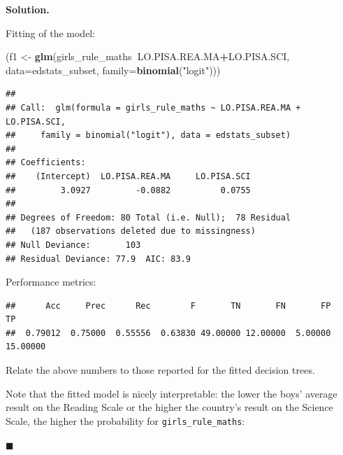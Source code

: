 \documentclass[10pt,b5paper,krantz1]{krantz}
\newenvironment{Shaded}{\begin{snugshade}}{\end{snugshade}}
\newcommand{\DataTypeTok}[1]{\textcolor[rgb]{0.27,0.27,0.27}{#1}}
\newcommand{\FloatTok}[1]{\textcolor[rgb]{0.06,0.06,0.06}{#1}}
\newcommand{\KeywordTok}[1]{\textcolor[rgb]{0.27,0.27,0.27}{\textbf{#1}}}
\newcommand{\NormalTok}[1]{#1}
\newcommand{\OperatorTok}[1]{\textcolor[rgb]{0.43,0.43,0.43}{\textbf{#1}}}
\newcommand{\StringTok}[1]{\textcolor[rgb]{0.5,0.5,0.5}{#1}}
\newenvironment{solution}{%
\bigskip\noindent\textbf{Solution. }%
\it\ignorespaces%
\ignorespaces%
}{\ignorespaces%
\hfill$\blacksquare$%
}
\begin{document}
\begin{solution}

Fitting of the model:

\begin{Shaded}
\begin{Highlighting}[]
\NormalTok{(f1 <-}\StringTok{ }\KeywordTok{glm}\NormalTok{(girls_rule_maths}\OperatorTok{~}\NormalTok{LO.PISA.REA.MA}\OperatorTok{+}\NormalTok{LO.PISA.SCI,}
    \DataTypeTok{data=}\NormalTok{edstats_subset, }\DataTypeTok{family=}\KeywordTok{binomial}\NormalTok{(}\StringTok{"logit"}\NormalTok{)))}
\end{Highlighting}
\end{Shaded}

\begin{verbatim}
## 
## Call:  glm(formula = girls_rule_maths ~ LO.PISA.REA.MA + LO.PISA.SCI, 
##     family = binomial("logit"), data = edstats_subset)
## 
## Coefficients:
##    (Intercept)  LO.PISA.REA.MA     LO.PISA.SCI  
##         3.0927         -0.0882          0.0755  
## 
## Degrees of Freedom: 80 Total (i.e. Null);  78 Residual
##   (187 observations deleted due to missingness)
## Null Deviance:       103 
## Residual Deviance: 77.9  AIC: 83.9
\end{verbatim}

Performance metrics:

\begin{Shaded}
\end{Shaded}

\begin{verbatim}
##      Acc     Prec      Rec        F       TN       FN       FP       TP 
##  0.79012  0.75000  0.55556  0.63830 49.00000 12.00000  5.00000 15.00000
\end{verbatim}

Relate the above numbers to those reported for the fitted decision trees.

Note that the fitted model is nicely interpretable:
the lower the boys' average result on the Reading Scale
or the higher the country's result on the Science Scale,
the higher the probability for \texttt{girls\_rule\_maths}:


\end{solution}
\end{document}
